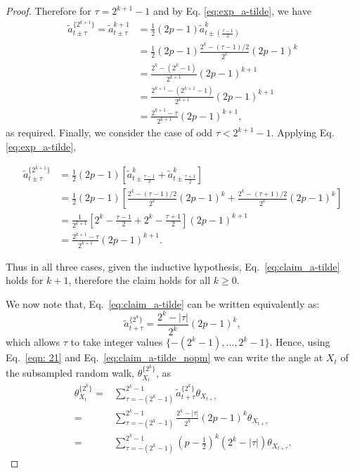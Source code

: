 \documentclass[english]{article}
\begin{document}
\begin{proof}
Therefore for $\tau=2^{k+1}-1$ and by Eq. \ref{eq:exp_a-tilde}, we have
\begin{align} \nonumber
\tilde{a}^{\{2^{k+1}\}}_{t\pm\tau}=\tilde{a}^{k+1}_{t\pm\tau}
&= \frac{1}{2}(2p-1)\tilde{a}^{k}_{t\pm(\frac{\tau -1}{2})}
\\ \nonumber
&=\frac{1}{2}(2p-1) \frac{2^k-(\tau-1)/2}{2^k}(2p-1)^k
\\ \nonumber
&= \frac{2^k-(2^k-1)}{2^{k+1}}(2p-1)^{k+1}
\\ \nonumber
&= \frac{2^{k+1}-(2^{k+1}-1)}{2^{k+1}}(2p-1)^{k+1}
\\ \nonumber
&= \frac{2^{k+1}-\tau}{2^{k+1}}(2p-1)^{k+1},
\end{align}
as required.  Finally, we consider the case of odd $\tau<2^{k+1}-1$. Applying Eq. \ref{eq:exp_a-tilde},

\begin{align*}
\tilde{a}^{\{2^{k+1}\}}_{t\pm\tau}
&= \frac{1}{2}(2p-1)\left[\tilde{a}^{k}_{t\pm\frac{\tau-1}{2}}+\tilde{a}^{k}_{t\pm\frac{\tau+1}{2}}\right]
\\
&=\frac{1}{2}(2p-1)\left[ \frac{2^k- (\tau-1)/2}{2^k}(2p-1)^k
+ \frac{2^k-(\tau+1)/2}{2^k}(2p-1)^k
\right]
\\
&=\frac{1}{2^{k+1}}\left[ 2^k-\frac{\tau-1}{2}
+2^k-\frac{\tau+1}{2}
\right](2p-1)^{k+1}
\\
&=\frac{2^{k+1}-\tau}{2^{k+1}}(2p-1)^{k+1}. 
\end{align*}

Thus in all three cases, given the inductive hypothesis, Eq.~\ref{eq:claim_a-tilde} holds for $k+1$, therefore the claim holds for all $k\geq 0$.

We now note that, Eq.~\ref{eq:claim_a-tilde} can be written equivalently as: 
\begin{equation} \label{eq:claim_a-tilde_nopm}
        \tilde{a}^{\{2^k\}}_{t+\tau}=\frac{2^k-\lvert\tau\rvert}{2^k}(2p-1)^k,
\end{equation}
which allows $\tau$ to take integer values $\{-(2^k-1),\ldots,2^k-1\}$. 
Hence, using Eq.~\ref{eqn: 21} and Eq.~\ref{eq:claim_a-tilde_nopm} we can write the angle at $X_t$ of the subsampled random walk, $\theta_{X_t}^{\{2^k\}}$, as
\begin{align}
    \theta_{X_t}^{\{2^k\}}=&\sum_{\tau=-(2^k-1)}^{2^k-1} \tilde{a}^{\{2^k\}}_{t+\tau} \theta_{X_{t+\tau}}\\\nonumber
    =&\sum_{\tau=-(2^k-1)}^{2^k-1} \frac{2^k-\lvert\tau\rvert}{2^k}(2p-1)^k\theta_{X_{t+\tau}}\\
   =&\sum_{\tau=-(2^k-1)}^{2^k-1}(p-\frac{1}{2})^k(2^k-\lvert\tau\rvert)\theta_{X_{t+\tau}}. \label{eq:28}   
\end{align}


\end{proof}
\end{document}
